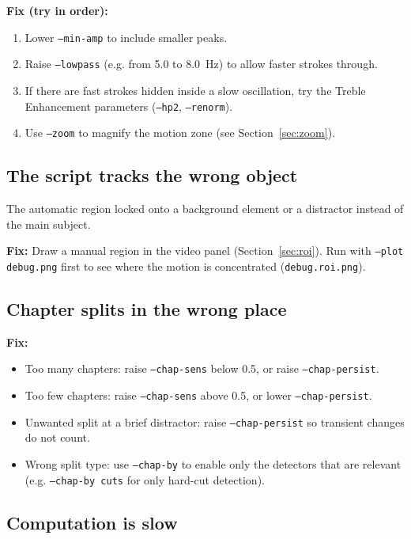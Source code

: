 \documentclass[11pt,a4paper]{article}
\newcommand{\code}[1]{\texttt{#1}}
\begin{document}
\textbf{Fix (try in order):}
\begin{enumerate}[noitemsep]
  \item Lower \code{--min-amp} to include smaller peaks.
  \item Raise \code{--lowpass} (e.g. from 5.0 to 8.0~Hz) to allow faster strokes through.
  \item If there are fast strokes hidden inside a slow oscillation, try the Treble Enhancement parameters (\code{--hp2}, \code{--renorm}).
  \item Use \code{--zoom} to magnify the motion zone (see Section~\ref{sec:zoom}).
\end{enumerate}

\subsection{The script tracks the wrong object}

The automatic region locked onto a background element or a distractor instead of the main subject.

\textbf{Fix:} Draw a manual region in the video panel (Section~\ref{sec:roi}). Run with \code{--plot debug.png} first to see where the motion is concentrated (\code{debug.roi.png}).

\subsection{Chapter splits in the wrong place}

\textbf{Fix:}
\begin{itemize}[noitemsep]
  \item Too many chapters: raise \code{--chap-sens} below 0.5, or raise \code{--chap-persist}.
  \item Too few chapters: raise \code{--chap-sens} above 0.5, or lower \code{--chap-persist}.
  \item Unwanted split at a brief distractor: raise \code{--chap-persist} so transient changes do not count.
  \item Wrong split type: use \code{--chap-by} to enable only the detectors that are relevant (e.g. \code{--chap-by cuts} for only hard-cut detection).
\end{itemize}

\subsection{Computation is slow}
\end{document}
